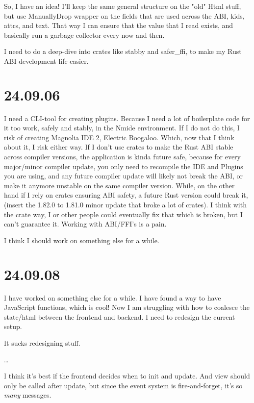 So, I have an idea! I'll keep the same general structure on the "old" Html stuff, but use
ManuallyDrop wrapper on the fields that are used across the ABI, kids, attrs, and text. That way I
can ensure that the value that I read exists, and basically run a garbage collector every now and
then.

I need to do a deep-dive into crates like stabby and safer_ffi, to make my Rust ABI development life
easier.


\section{24.09.06}

I need a CLI-tool for creating plugins. Because I need a lot of boilerplate code for it too work,
safely and stably, in the Nmide environment. If I do not do this, I risk of creating Magnolia IDE
2, Electric Boogaloo. Which, now that I think about it, I risk either way. If I don't use crates to
make the Rust ABI stable across compiler versions, the application is kinda future safe, because for
every major/minor compiler update, you only need to recompile the IDE and Plugins you are using, and
any future compiler update will likely not break the ABI, or make it anymore unstable on the same
compiler version. While, on the other hand if I rely on crates ensuring ABI safety, a future Rust
version could break it, (insert the 1.82.0 to 1.81.0 minor update that broke a lot of crates). I
think with the crate way, I or other people could eventually fix that which is broken, but I can't
guarantee it. Working with ABI/FFI's is a pain.

I think I should work on something else for a while.


\section{24.09.08}

I have worked on something else for a while. I have found a way to have JavaScript functions, which is
cool! Now I am struggling with how to coalesce the state/html between the frontend and backend. I need
to redesign the current setup.

It sucks redesigning stuff.

\dots

I think it's best if the frontend decides when to init and update. And view should only be called after
update, but since the event system is fire-and-forget, it's so \textit{many} messages.

